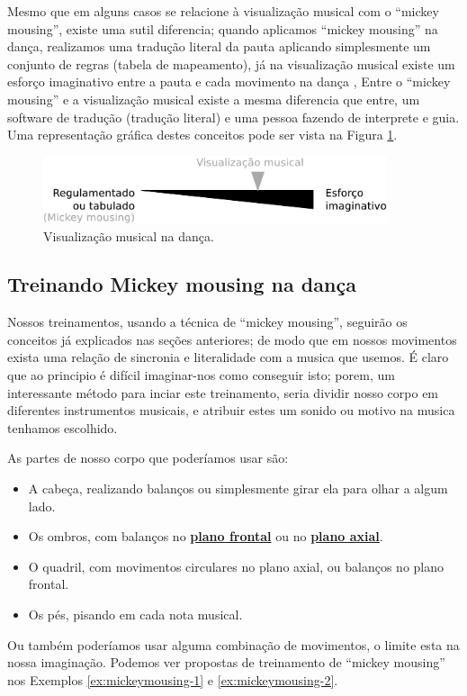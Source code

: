 Mesmo que em alguns casos se relacione à visualização musical com o ``mickey mousing'',
existe uma sutil diferencia; quando aplicamos ``mickey mousing'' na dança, 
realizamos uma  tradução literal da pauta aplicando simplesmente um conjunto de regras (tabela de mapeamento),
já na visualização musical existe um esforço imaginativo entre a pauta e cada movimento na dança \cite[pp. 177]{acocella2004mark},
Entre o ``mickey mousing'' e a visualização musical existe a mesma diferencia que entre,
um software de tradução (tradução literal) e uma pessoa fazendo de interprete e guia.
Uma representação gráfica destes conceitos pode ser vista na Figura \ref{fig:musicvisualization}.

\begin{figure}[h!]
    \centering
    \includegraphics[width=0.9\textwidth]{chapters/cap-musicalidade-tecnica/musicvisualization.eps}
    \caption{Visualização musical na dança.}
    \label{fig:musicvisualization}
\end{figure}

\subsection{Treinando Mickey mousing na dança} 
Nossos treinamentos, usando a técnica de ``mickey mousing'',
seguirão os conceitos já explicados nas seções anteriores;
de modo que em nossos movimentos exista uma relação de sincronia e
literalidade com a musica que usemos.
É claro que ao principio é difícil imaginar-nos como conseguir isto;
porem, um interessante método para inciar este treinamento, 
seria dividir nosso corpo em diferentes instrumentos musicais, 
e atribuir estes um sonido ou motivo na musica tenhamos escolhido.

As partes de nosso corpo que poderíamos usar são:
\begin{itemize}
\item A cabeça, realizando balanços ou simplesmente girar ela para olhar a algum lado.
\item Os ombros, com balanços no \hyperref[def:PlanoFrontal]{\textbf{plano frontal}} ou 
no \hyperref[def:PlanoAxial]{\textbf{plano axial}}.
\item O quadril, com movimentos circulares no plano axial, ou balanços no plano frontal.
\item Os pés, pisando em cada nota musical.
\end{itemize}
Ou também poderíamos usar alguma combinação de movimentos,
o limite esta na nossa imaginação.
Podemos ver propostas de treinamento de ``mickey mousing'' nos Exemplos \ref{ex:mickeymousing-1} e \ref{ex:mickeymousing-2}.

